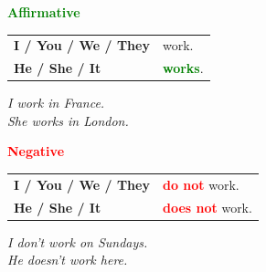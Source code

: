 \documentclass[a4paper,10pt]{article}
\newcommand{\sectiontitle}[2]{%
  {\large\bfseries\textcolor{#1}{#2}}%
}
\begin{document}
\begin{minipage}[t]{.485\textwidth}
\begin{greenbox}
  \sectiontitle{Green}{Affirmative}

  \vspace{0.75mm}
  \begin{tabular}{@{}>{\bfseries}l l@{}}
    I / You / We / They & work.\\
    He / She / It & \textcolor{Green}{\bfseries works}.
  \end{tabular}

  \vspace{0.75mm}
  \textit{I work in France.}\\[-1mm]
  \textit{She works in London.}
\end{greenbox}
\end{minipage}
\hfill
\begin{minipage}[t]{.485\textwidth}
\begin{redbox}
  \sectiontitle{Red}{Negative}

  \vspace{0.75mm}
  \begin{tabular}{@{}>{\bfseries}l l@{}}
    I / You / We / They & \textcolor{Red}{\bfseries do not} work.\\
    He / She / It & \textcolor{Red}{\bfseries does not} work.
  \end{tabular}

  \vspace{0.75mm}
  \textit{I don't work on Sundays.}\\[-1mm]
  \textit{He doesn't work here.}
\end{redbox}
\end{minipage}

\vspace{1.35mm}
\end{document}
